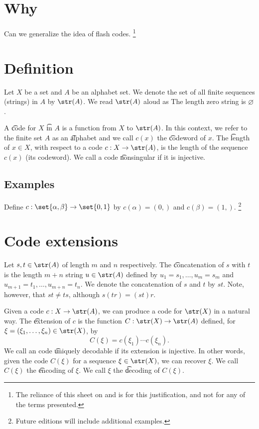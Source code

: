 
\section*{Why}

Can we generalize the idea of flash codes.
  \ifhmode\unskip\fi\footnote{
The reliance of this sheet on  and  is for this justification, and not for any of the terms presented.
  }

\section*{Definition}

Let $X$ be a set and $A$ be an alphabet set.
We denote the set of all finite sequences (strings) in $A$ by $\str(A)$.
We read $\str(A)$ aloud as 
The length zero string is $\varnothing$.

A \t{code} for $X$ \t{in} $A$ is a function from $X$ to $\str(A)$.
In this context, we refer to the finite set $A$ as an \t{alphabet} and we call $c(x)$ the \t{codeword} of $x$.
The \t{length} of $x \in X$, with respect to a code $c: X \to \str(A)$, is the length of the sequence $c(x)$ (its codeword).
We call a code \t{nonsingular} if it is injective.

\subsection*{Examples}

Define $c: \set{\alpha , \beta } \to \set{0, 1}$ by $c(\alpha ) = (0,)$ and $c(\beta ) = (1,)$.
  \ifhmode\unskip\fi\footnote{
Future editions will include additional examples.
  }

\section*{Code extensions}


Let $s,t \in \str(A)$ of length $m$ and $n$ respectively.
The \t{concatenation} of $s$ with $t$ is the length $m+n$ string $u \in \str(A)$ defined by $u_{1} = s_1, \dots , u_m = s_m$ and $u_{m+1} = t_1, \dots , u_{m+n} = t_n$.
We denote the concatenation of $s$ and $t$ by $st$.
Note, however, that $st \neq ts$, although $s(tr) = (st)r$.

Given a code $c: X \to \str(A)$, we can produce a code for $\str(X)$ in a natural way.
The \t{extension} of $c$ is the function $C: \str(X) \to \str(A)$ defined, for $\xi  = (\xi _1, \dots , \xi _n) \in \str(X)$, by
  \[
C(\xi ) = c(\xi _1) \cdots c(\xi _n).
  \]
We call an code \t{uniquely decodable} if its extension is injective.
In other words, given the code $C(\xi )$ for a sequence $\xi \in \str(X)$, we can recover $\xi $.
We call $C(\xi )$ the \t{encoding} of $\xi $.
We call $\xi $ the \t{decoding} of $C(\xi )$.
